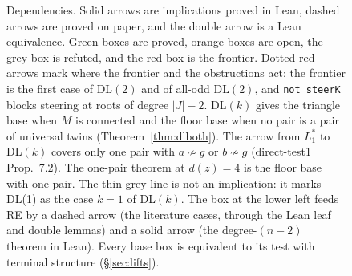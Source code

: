 \documentclass[11pt]{amsart}
\theoremstyle{definition}
\begin{document}
\begin{figure}[!tp]
{}
\caption{Dependencies. Solid arrows are implications proved in Lean, dashed arrows are proved on paper,
and the double arrow is a Lean equivalence. Green boxes are proved, orange boxes are open, the grey box is
refuted, and the red box is the frontier. Dotted red arrows mark where the frontier and the obstructions
act: the frontier is the first case of DL$(2)$ and of all-odd DL$(2)$, and \texttt{not\_steerK} blocks
steering at roots of degree $|J|-2$. DL$(k)$ gives the triangle base when $M$ is connected and the floor base when no pair is a pair of
universal twins (Theorem~\ref{thm:dlboth}). The arrow from $L_1^*$ to DL$(k)$ covers only one pair with
$a\not\sim g$ or $b\not\sim g$ (direct-test1 Prop.~7.2). The one-pair theorem at $d(z)=4$ is the floor
base with one pair. The thin grey line is not an implication: it marks DL(1) as the case $k=1$ of
DL$(k)$. The box at the lower left feeds RE by a dashed arrow (the literature cases, through the Lean
leaf and double lemmas) and a solid arrow (the degree-$(n-2)$ theorem in Lean). Every base box is equivalent to its test with
terminal structure (\S\ref{sec:lifts}).}\label{fig:deps}
\end{figure}
\end{document}
